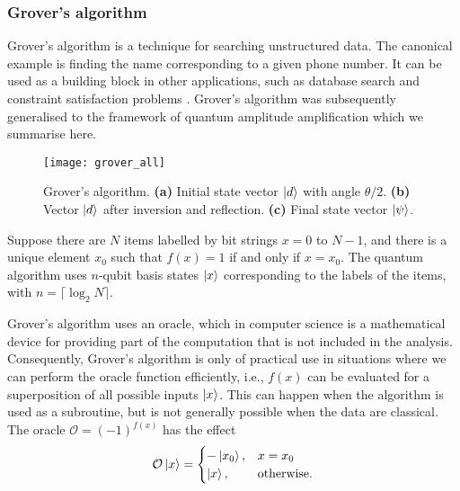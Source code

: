 \documentclass[10pt]{iopart}
\begin{document}
\subsubsection{Grover's algorithm}\label{sssec:search}\hfill

Grover's algorithm \cite{Grover1996,Grover1997} is a technique for searching unstructured data. The canonical example is finding the name corresponding to a given phone number.  It can be used as a building block in other applications, such as database search and constraint satisfaction problems \cite{Ambainis2006}. Grover's algorithm was subsequently generalised to the framework of quantum amplitude amplification \cite{Brassard2002} which we summarise here.
%
\begin{figure*}[ht!]
\centering
\texttt{[image: grover\_all]}
\caption{Grover's algorithm. \textbf{(a)} Initial state vector $\ket{d}$ with angle $\theta/2$. \textbf{(b)} Vector $\ket{d}$ after inversion and reflection. \textbf{(c)} Final state vector $\ket{\psi}$.}
\label{fig:grover}
\end{figure*}

Suppose there are $N$ items labelled by bit strings $x=0$ to $N-1$, and there is a unique element $x_0$ such that $f(x)=1$ if and only if $x=x_0$. The quantum algorithm uses $n$-qubit basis states $\ket{x}$ corresponding to the labels of the items, with $n=\lceil\log_2 N\rceil$.

Grover's algorithm uses an oracle, which in computer science is a mathematical device for providing part of the computation that is not included in the analysis.  Consequently, Grover's algorithm is only of practical use in situations where we can perform the oracle function efficiently, i.e., $f(x)$ can be evaluated for a superposition of all possible inputs $\ket{x}$.  This can happen when the algorithm is used as a subroutine, but is not generally possible when the data are classical.
The oracle $\mathcal{O} = (-1)^{f(x)}$ has the effect
\begin{equation}
\mathcal{O} \ket{x} =
\begin{cases}
-\ket{x_0}, & x=x_0 \\
\ket{x}, & \textrm{otherwise.} \\
\end{cases}
\end{equation}
\end{document}
